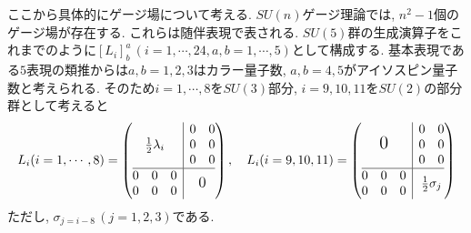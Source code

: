 \documentclass[uplatex,dvipdfmx,a4paper,titlepage]{jsbook}
\theoremstyle{plain}
\theoremstyle{definition}
\begin{document}
{ここから具体的にゲージ場について考える.
$SU(n)$ゲージ理論では, $n^2-1$個のゲージ場が存在する.
これらは随伴表現で表される.
$SU(5)$群の生成演算子をこれまでのように$[L_i]^a_b\,(i=1,\cdots,24, a,b=1,\cdots,5)$として構成する.
基本表現である$5$表現の類推からは$a,b=1,2,3$はカラー量子数, $a,b=4,5$がアイソスピン量子数と考えられる.
そのため$i=1,\cdots,8$を$SU(3)$部分, $i=9,10,11$を$SU(2)$の部分群として考えると
\begin{align}
  L_i(i=1,\cdots,8) = \left(\begin{array}{@{}c|c@{}}
      \mbox{$\frac{1}{2}\lambda_i$} &
      \begin{matrix}
        0 & 0 \\
        0 & 0 \\
        0 & 0 
      \end{matrix}\\
      \hline
      \begin{matrix}
        0 & 0 & 0\\
        0 & 0 & 0
      \end{matrix} &{\large{\mbox{$0$}}}
  \end{array}\right),\quad
  L_i(i=9,10,11) = \left(\begin{array}{@{}c|c@{}}
      \mbox{\Large 0} &
      \begin{matrix}
        0 & 0 \\
        0 & 0 \\
        0 & 0 
      \end{matrix}\\
      \hline
      \begin{matrix}
        0 & 0 & 0\\
        0 & 0 & 0
      \end{matrix} & {\mbox{$\frac{1}{2}\sigma_j$}}
  \end{array}\right)
\end{align}
ただし, $\sigma_{j=i-8}\,(j=1,2,3)$である.

}
\end{document}
